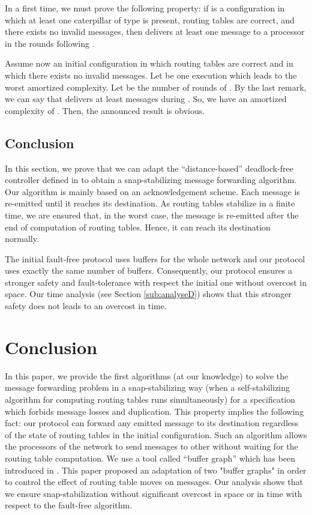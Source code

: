 \documentclass[11pt]{article}
\newenvironment{sketchproof}{{\noindent\bf Sketch of proof. } }{{\hfill }}
\begin{document}
\begin{sketchproof}
In a first time, we must prove the following property: if  is a configuration in which at least one caterpillar of type   is present, routing tables are correct, and there exists no invalid messages, then \AD delivers at least one message to a processor in the  rounds following .

Assume now an initial configuration in which routing tables are correct and in which there exists no invalid messages. Let  be one execution which leads to the worst amortized complexity. Let  be the number of rounds of . By the last remark, we can say that \AD delivers at
least  messages during . So, we have an amortized complexity of . Then, the announced result is obvious.
\end{sketchproof}

\subsection{Conclusion}

In this section, we prove that we can adapt the ``distance-based'' deadlock-free controller defined in \cite{MS78} to obtain a snap-stabilizing message forwarding algorithm. Our algorithm is mainly based on an acknowledgement scheme. Each message is re-emitted until it reaches its destination. As routing tables stabilize in a finite time, we are ensured that, in the worst case, the message is re-emitted after the end of computation of routing tables. Hence, it can reach its destination normally.

The initial fault-free protocol uses  buffers for the whole network and our protocol uses exactly the same number of buffers. Consequently, our protocol ensures a stronger safety and fault-tolerance with respect the initial one without overcost in space. Our time analysis (see Section \ref{sub:analyseD}) shows that this stronger safety does not leads to an overcost in time.

\section{Conclusion}\label{sec:Conclusion}

In this paper, we provide the first algorithms (at our knowledge) to solve the message forwarding problem in a snap-stabilizing way (when a self-stabilizing algorithm for computing routing tables runs simultaneously) for a specification which forbids message losses and duplication. This property implies the following fact: our protocol can forward any emitted message to its destination regardless of the state of routing tables in the initial configuration. Such an algorithm allows the processors of the network to send messages to other without waiting for the routing table computation. We use a tool called ``buffer graph'' which has been introduced in \cite{MS78}. This paper proposed an adaptation of two "buffer graphs" in order to control the effect of routing table moves on messages. Our analysis shows that we ensure snap-stabilization without significant overcost in space or in time with respect to the fault-free algorithm.
\end{document}
